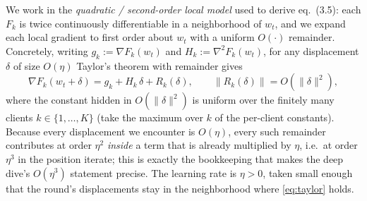 \documentclass[11pt]{article}
\theoremstyle{definition}
\theoremstyle{remark}
\begin{document}
We work in the \emph{quadratic / second-order local model} used to derive eq.~(3.5): each
$F_k$ is twice continuously differentiable in a neighborhood of $w_t$, and we expand each
local gradient to first order about $w_t$ with a uniform $O(\cdot)$ remainder. Concretely,
writing $g_k:=\nabla F_k(w_t)$ and $H_k:=\nabla^2 F_k(w_t)$, for any displacement $\delta$ of
size $O(\eta)$ Taylor's theorem with remainder gives
\begin{equation}
\nabla F_k(w_t+\delta)=g_k+H_k\,\delta+R_k(\delta),\qquad \|R_k(\delta)\|=O(\|\delta\|^2),
\label{eq:taylor}
\end{equation}
where the constant hidden in $O(\|\delta\|^2)$ is uniform over the finitely many clients
$k\in\{1,\dots,K\}$ (take the maximum over $k$ of the per-client constants). Because every
displacement we encounter is $O(\eta)$, every such remainder contributes at order $\eta^2$
\emph{inside} a term that is already multiplied by $\eta$, i.e.\ at order $\eta^3$ in the
position iterate; this is exactly the bookkeeping that makes the deep dive's $O(\eta^3)$
statement precise. The learning rate is $\eta>0$, taken small enough that the round's
displacements stay in the neighborhood where \eqref{eq:taylor} holds.
\end{document}
